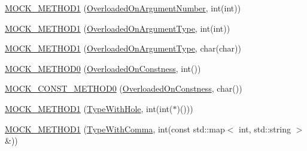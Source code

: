 \begin{DoxyCompactItemize}
\item 
\mbox{\hyperlink{classtesting_1_1gmock__generated__function__mockers__test_1_1_mock_foo_a45014dba5c27e9d59af3a94e0d324096}{M\+O\+C\+K\+\_\+\+M\+E\+T\+H\+O\+D1}} (\mbox{\hyperlink{classtesting_1_1gmock__generated__function__mockers__test_1_1_foo_interface_ae9e86ac64fa9acedfb1fa747174c7f43}{Overloaded\+On\+Argument\+Number}}, int(int))
\item 
\mbox{\hyperlink{classtesting_1_1gmock__generated__function__mockers__test_1_1_mock_foo_ad900c5945fc52a0a95ca1480207c7add}{M\+O\+C\+K\+\_\+\+M\+E\+T\+H\+O\+D1}} (\mbox{\hyperlink{classtesting_1_1gmock__generated__function__mockers__test_1_1_foo_interface_ad9cc9a11570403fb8378ed6620892ec6}{Overloaded\+On\+Argument\+Type}}, int(int))
\item 
\mbox{\hyperlink{classtesting_1_1gmock__generated__function__mockers__test_1_1_mock_foo_ab4b323a9c06a48c1116d55419195c1a6}{M\+O\+C\+K\+\_\+\+M\+E\+T\+H\+O\+D1}} (\mbox{\hyperlink{classtesting_1_1gmock__generated__function__mockers__test_1_1_foo_interface_ad9cc9a11570403fb8378ed6620892ec6}{Overloaded\+On\+Argument\+Type}}, char(char))
\item 
\mbox{\hyperlink{classtesting_1_1gmock__generated__function__mockers__test_1_1_mock_foo_a291ff46b043d00d0f0acb081c5c36f2e}{M\+O\+C\+K\+\_\+\+M\+E\+T\+H\+O\+D0}} (\mbox{\hyperlink{classtesting_1_1gmock__generated__function__mockers__test_1_1_foo_interface_afbbe6ec72ae237de05e109dea5b03f4f}{Overloaded\+On\+Constness}}, int())
\item 
\mbox{\hyperlink{classtesting_1_1gmock__generated__function__mockers__test_1_1_mock_foo_aa0da575ad3061850662c5f401ddb30c2}{M\+O\+C\+K\+\_\+\+C\+O\+N\+S\+T\+\_\+\+M\+E\+T\+H\+O\+D0}} (\mbox{\hyperlink{classtesting_1_1gmock__generated__function__mockers__test_1_1_foo_interface_afbbe6ec72ae237de05e109dea5b03f4f}{Overloaded\+On\+Constness}}, char())
\item 
\mbox{\hyperlink{classtesting_1_1gmock__generated__function__mockers__test_1_1_mock_foo_a33077a71c1c5178c25b0a4aa099d5f2c}{M\+O\+C\+K\+\_\+\+M\+E\+T\+H\+O\+D1}} (\mbox{\hyperlink{classtesting_1_1gmock__generated__function__mockers__test_1_1_foo_interface_a9e92ef227dc68806f85ebff9c8a6102a}{Type\+With\+Hole}}, int(int($\ast$)()))
\item 
\mbox{\hyperlink{classtesting_1_1gmock__generated__function__mockers__test_1_1_mock_foo_a3774adcc0155dd4c3b5fd790a6f40261}{M\+O\+C\+K\+\_\+\+M\+E\+T\+H\+O\+D1}} (\mbox{\hyperlink{classtesting_1_1gmock__generated__function__mockers__test_1_1_foo_interface_a64544adcb9c502a8fbc3990b53f4c767}{Type\+With\+Comma}}, int(const std\+::map$<$ int, std\+::string $>$ \&))
\end{DoxyCompactItemize}
